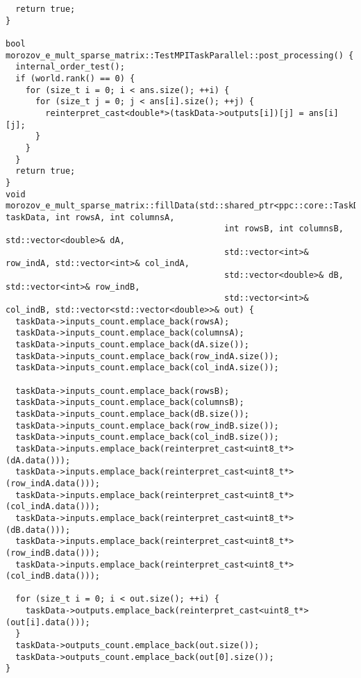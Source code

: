 \documentclass[a4paper,12pt]{article}
\begin{document}
\begin{lstlisting}
  return true;
}

bool morozov_e_mult_sparse_matrix::TestMPITaskParallel::post_processing() {
  internal_order_test();
  if (world.rank() == 0) {
    for (size_t i = 0; i < ans.size(); ++i) {
      for (size_t j = 0; j < ans[i].size(); ++j) {
        reinterpret_cast<double*>(taskData->outputs[i])[j] = ans[i][j];
      }
    }
  }
  return true;
}
void morozov_e_mult_sparse_matrix::fillData(std::shared_ptr<ppc::core::TaskData>& taskData, int rowsA, int columnsA,
                                            int rowsB, int columnsB, std::vector<double>& dA,
                                            std::vector<int>& row_indA, std::vector<int>& col_indA,
                                            std::vector<double>& dB, std::vector<int>& row_indB,
                                            std::vector<int>& col_indB, std::vector<std::vector<double>>& out) {
  taskData->inputs_count.emplace_back(rowsA);
  taskData->inputs_count.emplace_back(columnsA);
  taskData->inputs_count.emplace_back(dA.size());
  taskData->inputs_count.emplace_back(row_indA.size());
  taskData->inputs_count.emplace_back(col_indA.size());

  taskData->inputs_count.emplace_back(rowsB);
  taskData->inputs_count.emplace_back(columnsB);
  taskData->inputs_count.emplace_back(dB.size());
  taskData->inputs_count.emplace_back(row_indB.size());
  taskData->inputs_count.emplace_back(col_indB.size());
  taskData->inputs.emplace_back(reinterpret_cast<uint8_t*>(dA.data()));
  taskData->inputs.emplace_back(reinterpret_cast<uint8_t*>(row_indA.data()));
  taskData->inputs.emplace_back(reinterpret_cast<uint8_t*>(col_indA.data()));
  taskData->inputs.emplace_back(reinterpret_cast<uint8_t*>(dB.data()));
  taskData->inputs.emplace_back(reinterpret_cast<uint8_t*>(row_indB.data()));
  taskData->inputs.emplace_back(reinterpret_cast<uint8_t*>(col_indB.data()));

  for (size_t i = 0; i < out.size(); ++i) {
    taskData->outputs.emplace_back(reinterpret_cast<uint8_t*>(out[i].data()));
  }
  taskData->outputs_count.emplace_back(out.size());
  taskData->outputs_count.emplace_back(out[0].size());
}
\end{lstlisting}
\end{document}

